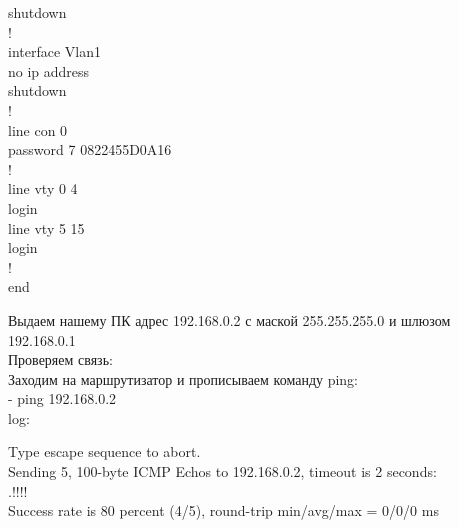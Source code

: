 \documentclass[a4paper,14pt]{extarticle}
\begin{document}
\begin{singlespace}
\begin{tcolorbox}[breakable]
             shutdown\\
            !\\
            interface Vlan1\\
             no ip address\\
             shutdown\\
            !\\
            line con 0\\
             password 7 0822455D0A16\\
            !\\
            line vty 0 4\\
             login\\
            line vty 5 15\\
             login\\
            !\\
            end
        \end{tcolorbox}
    \end{singlespace}

    Выдаем нашему ПК адрес 192.168.0.2 с маской 255.255.255.0 
    и шлюзом 192.168.0.1\\

    Проверяем связь:\\
    Заходим на маршрутизатор и прописываем команду ping:\\
    - ping 192.168.0.2\\
    log:
    \begin{singlespace}
        \begin{tcolorbox}
            Type escape sequence to abort.\\
            Sending 5, 100-byte ICMP Echos to 192.168.0.2, timeout is 2 seconds:\\
            .!!!!\\
            Success rate is 80 percent (4/5), round-trip min/avg/max = 0/0/0 ms
        \end{tcolorbox}
    \end{singlespace}
     
\end{document}
